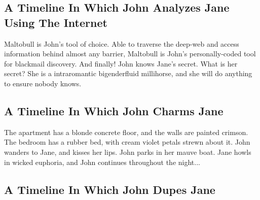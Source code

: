 \documentclass{article}
\begin{document}
\subsection{A Timeline In Which John Analyzes Jane Using The Internet}


Maltobull is John's tool of choice. Able to traverse the deep{-}web and access information behind almost any barrier, Maltobull is John's personally{-}coded tool for blackmail discovery.
And finally!
John knows Jane's secret. What is her secret? She is a intraromantic bigenderfluid millihorse, and she will do anything to ensure nobody knows.
\subsection{A Timeline In Which John Charms Jane}


The apartment has a blonde concrete floor, and the walls are painted crimson.
The bedroom has a rubber bed, with cream violet petals strewn about it.
John wanders to Jane, and kisses her lips.
John parks in her mauve boat.
Jane howls in wicked euphoria, and John continues throughout the night...
\subsection{A Timeline In Which John Dupes Jane}
\end{document}
